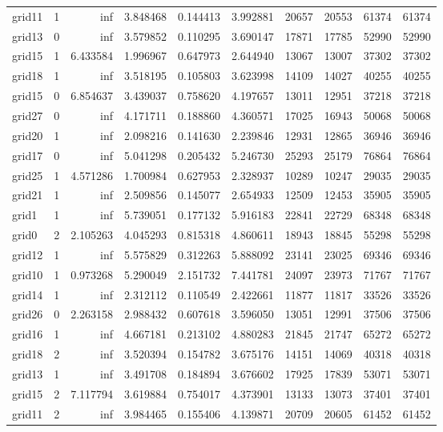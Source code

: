 \begin{longtable}{|l|r|r|r|r|r|r|r|r|r|}
grid11 & 1 & inf & 3.848468 & 0.144413 & 3.992881 & 20657 & 20553 & 61374 & 61374 \\
grid13 & 0 & inf & 3.579852 & 0.110295 & 3.690147 & 17871 & 17785 & 52990 & 52990 \\
grid15 & 1 & 6.433584 & 1.996967 & 0.647973 & 2.644940 & 13067 & 13007 & 37302 & 37302 \\
grid18 & 1 & inf & 3.518195 & 0.105803 & 3.623998 & 14109 & 14027 & 40255 & 40255 \\
grid15 & 0 & 6.854637 & 3.439037 & 0.758620 & 4.197657 & 13011 & 12951 & 37218 & 37218 \\
grid27 & 0 & inf & 4.171711 & 0.188860 & 4.360571 & 17025 & 16943 & 50068 & 50068 \\
grid20 & 1 & inf & 2.098216 & 0.141630 & 2.239846 & 12931 & 12865 & 36946 & 36946 \\
grid17 & 0 & inf & 5.041298 & 0.205432 & 5.246730 & 25293 & 25179 & 76864 & 76864 \\
grid25 & 1 & 4.571286 & 1.700984 & 0.627953 & 2.328937 & 10289 & 10247 & 29035 & 29035 \\
grid21 & 1 & inf & 2.509856 & 0.145077 & 2.654933 & 12509 & 12453 & 35905 & 35905 \\
grid1 & 1 & inf & 5.739051 & 0.177132 & 5.916183 & 22841 & 22729 & 68348 & 68348 \\
grid0 & 2 & 2.105263 & 4.045293 & 0.815318 & 4.860611 & 18943 & 18845 & 55298 & 55298 \\
grid12 & 1 & inf & 5.575829 & 0.312263 & 5.888092 & 23141 & 23025 & 69346 & 69346 \\
grid10 & 1 & 0.973268 & 5.290049 & 2.151732 & 7.441781 & 24097 & 23973 & 71767 & 71767 \\
grid14 & 1 & inf & 2.312112 & 0.110549 & 2.422661 & 11877 & 11817 & 33526 & 33526 \\
grid26 & 0 & 2.263158 & 2.988432 & 0.607618 & 3.596050 & 13051 & 12991 & 37506 & 37506 \\
grid16 & 1 & inf & 4.667181 & 0.213102 & 4.880283 & 21845 & 21747 & 65272 & 65272 \\
grid18 & 2 & inf & 3.520394 & 0.154782 & 3.675176 & 14151 & 14069 & 40318 & 40318 \\
grid13 & 1 & inf & 3.491708 & 0.184894 & 3.676602 & 17925 & 17839 & 53071 & 53071 \\
grid15 & 2 & 7.117794 & 3.619884 & 0.754017 & 4.373901 & 13133 & 13073 & 37401 & 37401 \\
grid11 & 2 & inf & 3.984465 & 0.155406 & 4.139871 & 20709 & 20605 & 61452 & 61452 \\

\end{longtable}
